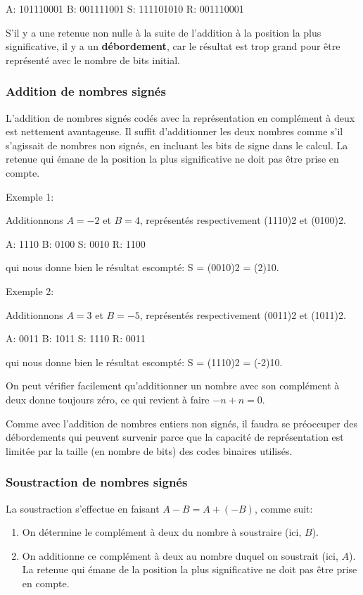 \documentclass[11pt]{article}
\begin{document}
A: 101110001
B: 001111001
S: 111101010
R: 001110001

S'il y a une retenue non nulle à la suite de l'addition à la position
la plus significative, il y a un \textbf{débordement}, car le résultat est trop
grand pour être représenté avec le nombre de bits initial.

\subsubsection{Addition de nombres signés}
\label{sec:org35ea386}

L'addition de nombres signés codés avec la représentation en complément
à deux est nettement avantageuse. Il suffit d'additionner les deux
nombres comme s'il s'agissait de nombres non signés, en incluant les
bits de signe dans le calcul. La retenue qui émane de la position la
plus significative ne doit pas être prise en compte. 

Exemple 1:

Additionnons \(A=-2\) et \(B=4\), représentés respectivement (1110)2 et (0100)2.

A: 1110
B: 0100
S: 0010
R: 1100

qui nous donne bien le résultat escompté: S = (0010)2 = (2)10.

Exemple 2:

Additionnons \(A=3\) et \(B=-5\), représentés respectivement (0011)2 et (1011)2.

A: 0011
B: 1011
S: 1110
R: 0011

qui nous donne bien le résultat escompté: S = (1110)2 = (-2)10.

On peut vérifier facilement qu'additionner un nombre avec son
complément à deux donne toujours zéro, ce qui revient à faire \(-n + n
= 0\).

Comme avec l'addition de nombres entiers non signés, il faudra se
préoccuper des débordements qui peuvent survenir parce que la capacité
de représentation est limitée par la taille (en nombre de bits) des
codes binaires utilisés.

\subsubsection{Soustraction de nombres signés}
\label{sec:orgea69927}

La soustraction s'effectue en faisant \(A - B = A + (-B)\), comme suit:

\begin{enumerate}
\item On détermine le complément à deux du nombre à soustraire (ici, \(B\)).
\item On additionne ce complément à deux au nombre duquel on soustrait  (ici, \(A\)). La
retenue qui émane de la position la plus significative ne doit pas
être prise en compte.
\end{enumerate}
\end{document}
